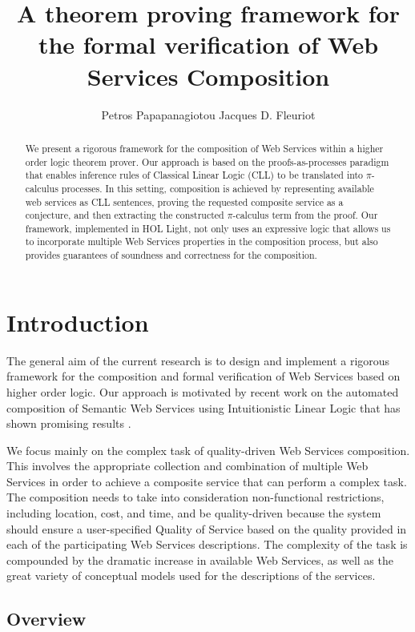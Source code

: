 \documentclass[copyright,creativecommons]{eptcs}
\title{A theorem proving framework for the formal verification of Web Services Composition}
\author{Petros Papapanagiotou \qquad\qquad Jacques D. Fleuriot
\institute{School of Informatics\\
University of Edinburgh \\
Informatics Forum, 10 Crichton Street\\
Edinburgh EH8 9AB, UK}
\email{P.Papapanagiotou@sms.ed.ac.uk \quad\qquad jdf@inf.ed.ac.uk}
}
\begin{document}
\maketitle


\begin{abstract}
We present a rigorous framework for the composition of Web Services within a higher order logic theorem prover. Our approach is based on the proofs-as-processes paradigm that enables inference rules of Classical Linear Logic (CLL) to be translated into $\pi$-calculus processes. In this setting, composition is achieved by representing available web services as CLL sentences, proving the requested composite service as a conjecture, and then extracting the constructed $\pi$-calculus term from the proof. Our framework, implemented in HOL Light, not only uses an expressive logic that allows us to incorporate multiple Web Services properties in the composition process, but also provides guarantees of soundness and correctness for the composition. 
\end{abstract}

\section{Introduction}
\label{intro}

The general aim of the current research is to design and implement a rigorous framework for the composition and formal verification of Web Services based on higher order logic. Our approach is motivated by recent work on the automated composition of Semantic Web Services using Intuitionistic Linear Logic that has shown promising results \cite{rao-semantic,rao2006composition}.

We focus mainly on the complex task of quality-driven Web Services composition. This involves the appropriate collection and combination of multiple Web Services in order to achieve a composite service that can perform a complex task. The composition needs to take into consideration non-functional restrictions, including location, cost, and time, and be quality-driven because the system should ensure a user-specified Quality of Service based on the quality provided in each of the participating Web Services descriptions. The complexity of the task is compounded by the dramatic increase in available Web Services, as well as the great variety of conceptual models used for the descriptions of the services. 

\subsection{Overview}
\label{overview}
\end{document}
